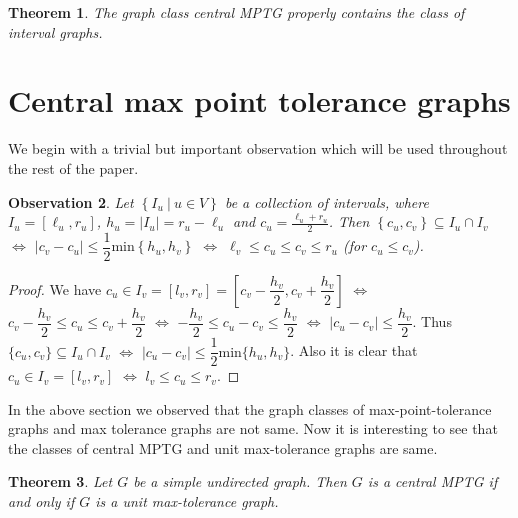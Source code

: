 \documentclass{article}
\newtheorem{thm}{Theorem}[section]
\newtheorem{obs}[thm]{Observation}
\theoremstyle{definition}
\numberwithin{equation}{section}
\newcommand{\set}[1]{\left\{#1\right\}}
\newcommand{\Set}[2]{\set{#1\ \vert\ #2}}
\begin{document}
\begin{thm} \cite{Soto}\label{sp}
The graph class central MPTG properly contains the class of interval graphs.
\end{thm}


\section{Central max point tolerance graphs}


\noindent We begin with a trivial but important observation which will be used throughout the rest of the paper.

\begin{obs}
Let $\Set{I_u}{u\in V}$ be a collection of intervals, where $I_u=[\ell_u,r_u]$, $h_u=|I_u|=r_u-\ell_u$ and $c_u=\frac{\ell_u+r_u}{2}$. Then $\set{c_u,c_v}\subseteq I_u\cap I_v$ $\Longleftrightarrow$ $|c_v-c_u|\leqslant \dfrac{1}{2} \text{min}\set{h_u,h_v}$ $\Longleftrightarrow$ $\ell_v\leqslant c_u\leqslant c_v\leqslant r_u$ (for $c_u\leqslant c_v$).
\end{obs}


\begin{proof}
We have $c_{u}\in I_{v}=[l_{v},r_{v}]=[c_{v}-\dfrac{h_{v}}{2},c_{v}+\dfrac{h_{v}}{2}]$ $\Longleftrightarrow$ $c_{v}-\dfrac{h_{v}}{2}\leq c_{u}\leq c_{v}+\dfrac{h_{v}}{2}$ $\Longleftrightarrow$ $-\dfrac{h_{v}}{2}\leq c_{u}-c_{v}\leq \dfrac {h_{v}}{2}$
$\Longleftrightarrow$ $|c_{u}-c_{v}|\leq \dfrac{h_{v}}{2}$. Thus $\{c_{u},c_{v}\}\subseteq I_{u}\cap I_{v}$
$\Longleftrightarrow$ $|c_{u}-c_{v}|\leq \dfrac{1}{2} \text{min}\{h_{u},h_{v}\}$. Also it is clear that $c_{u}\in I_{v}=[l_{v},r_{v}]$ $\Longleftrightarrow$ $l_{v}\leq c_{u}\leq r_{v}$.
\end{proof}

\noindent In the above section we observed that the graph classes of max-point-tolerance graphs and max tolerance graphs are not same. Now it is interesting to see that the classes of central MPTG and unit max-tolerance graphs are same.

\begin{thm}\label{umtg}
Let $G$ be a simple undirected graph. Then $G$ is a central MPTG if and only if $G$ is a unit max-tolerance graph.
\end{thm}
\end{document}
